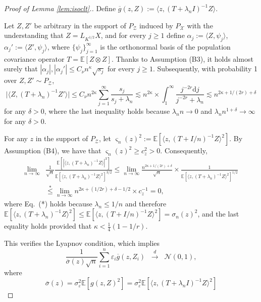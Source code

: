 \documentclass[11pt,a4paper]{article}
\renewcommand{\bar}{\overline}
\theoremstyle{definition}
\theoremstyle{plain}
\theoremstyle{remark}
\newcommand{\ud}{\mathrm d}
\begin{document}
\begin{proof}[Proof of Lemma \ref{lem:isoclt}.]
Define $\bar g(z,Z) := \langle z,(T+\lambda_n I)^{-1}Z\rangle$.
{\color{cyan}
Let $Z,Z'$ be arbitrary in the support of $P_{\mathcal Z}$ induced by $P_{\mathcal X}$ with the understanding that $Z=L_{K^{1/2}}X$,
and for every $j\geq 1$ define $\alpha_j := \langle Z,\psi_j\rangle$, $\alpha_j':=\langle Z',\psi_j\rangle$,
where $\{\psi_j\}_{j=1}^{\infty}$ is the orthonormal basis of the population covariance operator $T=\mathbb E[Z\otimes Z]$.
Thanks to Assumption (B3), it holds almost surely that $|\alpha_j|,|\alpha_j'|\leq C_\nu n^{\kappa}\sqrt{s_j}$ for every $j\geq 1$.
Subsequently, with probability 1 over $Z,Z'\sim P_{\mathcal Z}$, 
$$
\big|\langle Z,(T+\lambda_n)^{-1}Z'\rangle\big| \leq C_\nu n^{2\kappa}\sum_{j=1}^{\infty} \frac{s_j}{s_j+\lambda_n}\lesssim n^{2\kappa}\times \int_1^{\infty}\frac{ j^{-2r}\ud j}{j^{-2r}+\lambda_n} \lesssim n^{2\kappa+1/(2r)+\delta}
$$
for any $\delta>0$, where the last inequality holds because $\lambda_n n\to 0$ and $\lambda_n n^{1+\delta}\to \infty$ for any $\delta>0$.

For any $z$ in the support of $P_{\mathcal Z}$, let $\varsigma_n(z)^2 := \mathbb E[\langle z,(T+I/n)^{-1}Z\rangle^2]$.
By Assumption (B4), we have that $\varsigma_n(z)^2\geq c_z^2>0$. Consequently, 
\begin{align*}
\lim_{n\to\infty}& \frac{1}{\sqrt{n}}\frac{\mathbb E[|\langle z, (T+\lambda_n)^{-1}Z\rangle|^3]}{\mathbb E[\langle z,(T+\lambda_n)^{-1}Z\rangle^2]^{3/2}} \leq 
\lim_{n\to\infty}\frac{n^{2\kappa+1/(2r)+\delta}}{\sqrt{n}} \times \frac{1}{\mathbb E[\langle z,(T+\lambda_n)^{-1}Z\rangle^2]^{1/2}}\\
&\overset{*}{\leq} \lim_{n\to\infty} n^{2\kappa+(1/2r)+\delta-1/2}\times c_z^{-1} = 0,
\end{align*}
where Eq.~(*) holds because $\lambda_n\leq 1/n$ and therefore $\mathbb E[\langle z,(T+\lambda_n)^{-1}Z\rangle^2] \leq \mathbb E[\langle z,(T+I/n)^{-1}Z\rangle^2] = \sigma_n(z)^2$,
and the last equality holds provided that $\kappa < \frac{1}{4}(1-1/r)$.
}
This verifies the Lyapnov condition, which implies 
\begin{equation}
\frac{1}{\bar\sigma(z)\sqrt{n}}\sum_{i=1}^n \varepsilon_i\bar g(z,Z_i) \;\;\overset{d}{\to}\;\;\mathcal N(0,1),
\label{eq:proof-isoclt-1}
\end{equation}
where
$$
\bar\sigma(z) =\sigma_\varepsilon^2\mathbb E[g(z,Z)^2]= \sigma_\varepsilon^2\mathbb E[\langle z, (T+\lambda_n I)^{-1}Z\rangle^2]
$$


\end{proof}
\end{document}

